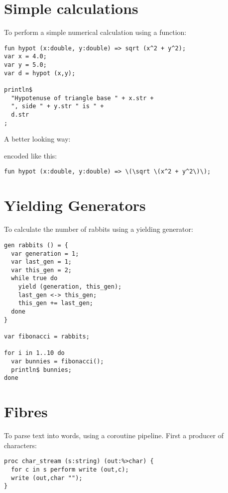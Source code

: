 \documentclass[oneside]{book}
\begin{document}
\section{Simple calculations}
To perform a simple numerical calculation using a function:

\begin{verbatim}
fun hypot (x:double, y:double) => sqrt (x^2 + y^2);
var x = 4.0;
var y = 5.0;
var d = hypot (x,y);

println$ 
  "Hypotenuse of triangle base " + x.str + 
  ", side " + y.str " is " + 
  d.str
;
\end{verbatim}

A better looking way:


encoded like this:

\begin{verbatim}
fun hypot (x:double, y:double) => \(\sqrt \(x^2 + y^2\)\);
\end{verbatim}

\section{Yielding Generators}
To calculate the number of rabbits using a yielding generator:

\begin{verbatim}
gen rabbits () = {
  var generation = 1;
  var last_gen = 1;
  var this_gen = 2;
  while true do
    yield (generation, this_gen);
    last_gen <-> this_gen;
    this_gen += last_gen;
  done
}

var fibonacci = rabbits;

for i in 1..10 do
  var bunnies = fibonacci(); 
  println$ bunnies;
done
\end{verbatim}

\section{Fibres}
To parse text into words, using a coroutine pipeline.
First a producer of characters:

\begin{verbatim}
proc char_stream (s:string) (out:%>char) {
  for c in s perform write (out,c);
  write (out,char "");
}
\end{verbatim}
\end{document}
